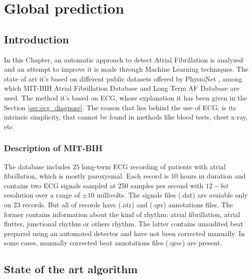 \chapter{Global prediction}
\label{sec:global}

\section{Introduction}
In this Chapter, an automatic approach to detect Atrial Fibrillation is analyzed and an attempt to improve it is made through Machine Learning techniques. The state of art it's based on different public datasets offered by PhysioNet \cite{physionet}, among which MIT-BIH Atrial Fibrillation Database \cite{afdb} and Long Term AF Database \cite{ltafdb} are used.
The method it's based on ECG, whose explanation it has been given in the Section \ref{sec:ecg_diagnose}. The reason that lies behind the use of ECG, is its intrinsic simplicity, that cannot be found in methods like blood tests, chest x-ray, etc.

\subsection{Description of MIT-BIH}
The database includes $25$ long-term ECG recording of patients with atrial fibrillation, which is mostly paroxysmal. Each record is $10$ hours in duration and contains two ECG signals sampled at 250 samples per second with $12-bit$ resolution over a range of $\pm 10$ millivolts. The signals files (.dat) are avaiable only on 23 records. But all of records have (.atr) and (.qrs) annotations files. The former contains information about the kind of rhythm: atrial fibrillation, atrial flutter, junctional rhythm or others rhythm. The latter contains unaudited beat prepared using an automated detector and have not been corrected manually. In some cases, manually corrected beat annotations files (.qrsc) are present.

\section{State of the art algorithm}
